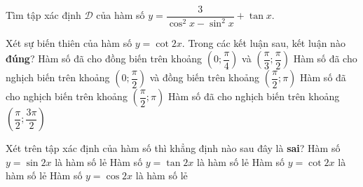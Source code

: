 \begin{ex}%
	Tìm tập  xác định $\mathscr{D}$ của hàm số
	$y=\dfrac{3}{\cos^2 x-\sin^2 x}+\tan  x$.
\end{ex}

\begin{ex}[c]%
	Xét sự biến thiên của hàm số $ y=\cot  2x $. Trong các kết luận sau, kết luận nào \textbf{đúng}?
	\choice 
		{Hàm số đã cho đồng biến trên  khoảng $ \left(0;\dfrac{\pi}{4}\right) $ và $ \left(\dfrac{\pi}{3};\dfrac{\pi}{2}\right) $}
		 {Hàm số đã cho nghịch biến trên khoảng $ \left(0;\dfrac{\pi}{2}\right) $ và đồng biến trên khoảng $ \left(\dfrac{\pi}{2};\pi \right) $}
		{\True Hàm số đã cho nghịch biến trên  khoảng $ \left(\dfrac{\pi}{2};\pi\right) $}
		{Hàm  số đã cho nghịch biến trên khoảng $ \left(\dfrac{\pi}{2};\dfrac{3\pi}{2}\right) $}
\end{ex}

\begin{ex}%
	Xét trên  tập xác định của hàm số thì khẳng định nào sau đây là {\bf sai}?
	\choice 
		{Hàm số $y = \sin  2x$ là hàm số lẻ}
		{Hàm số $y  = \tan 2x$ là hàm số lẻ}
		{Hàm số  $y = \cot 2x$ là hàm số lẻ}
		{\True Hàm số $y = \cos 2x$ là hàm số lẻ} 
\end{ex}

